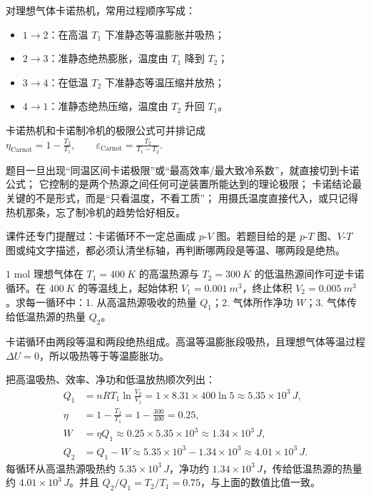 \documentclass[lang=cn,11pt]{elegantbook}
\begin{document}
对理想气体卡诺热机，常用过程顺序写成：
\begin{itemize}
 \item \(1\to2\)：在高温 \(T_1\) 下准静态等温膨胀并吸热；
 \item \(2\to3\)：准静态绝热膨胀，温度由 \(T_1\) 降到 \(T_2\)；
 \item \(3\to4\)：在低温 \(T_2\) 下准静态等温压缩并放热；
 \item \(4\to1\)：准静态绝热压缩，温度由 \(T_2\) 升回 \(T_1\)。
\end{itemize}

卡诺热机和卡诺制冷机的极限公式可并排记成
 \(\eta_{\text{Carnot}}=1-\frac{T_2}{T_1},\qquad \varepsilon_{\text{Carnot}}=\frac{T_2}{T_1-T_2}.\) 

\begin{note}
 题目一旦出现“同温区间卡诺极限”或“最高效率/最大致冷系数”，就直接切到卡诺公式； 它控制的是两个热源之间任何可逆装置所能达到的理论极限； 卡诺结论最关键的不是形式，而是“只看温度，不看工质”； 用摄氏温度直接代入，或只记得热机那条，忘了制冷机的趋势恰好相反。
\end{note}

\begin{remark}
课件还专门提醒过：卡诺循环不一定总画成 \(p\)-\(V\) 图。若题目给的是 \(p\)-\(T\) 图、\(V\)-\(T\) 图或纯文字描述，都必须认清坐标轴，再判断哪两段是等温、哪两段是绝热。
\end{remark}

\begin{exercise}
\(1\) mol 理想气体在 \(T_1=\SI{400}{K}\) 的高温热源与 \(T_2=\SI{300}{K}\) 的低温热源间作可逆卡诺循环。在 \(\SI{400}{K}\) 的等温线上，起始体积 \(V_1=\SI{0.001}{m^3}\)，终止体积 \(V_2=\SI{0.005}{m^3}\)。求每一循环中：1. 从高温热源吸收的热量 \(Q_1\)；2. 气体所作净功 \(W\)；3. 气体传给低温热源的热量 \(Q_2\)。
\end{exercise}

\begin{solution}
卡诺循环由两段等温和两段绝热组成。高温等温膨胀段吸热，且理想气体等温过程 \(\Delta U=0\)，所以吸热等于等温膨胀功。

把高温吸热、效率、净功和低温放热顺次列出：
\[
\begin{aligned}
Q_1&=nRT_1\ln\frac{V_2}{V_1}
=1\times8.31\times400\ln5
\approx 5.35\times10^3\,\si{J},\\
\eta&=1-\frac{T_2}{T_1}
=1-\frac{300}{400}
=0.25,\\
W&=\eta Q_1
\approx0.25\times5.35\times10^3
\approx1.34\times10^3\,\si{J},\\
Q_2&=Q_1-W
\approx 5.35\times10^3-1.34\times10^3
\approx4.01\times10^3\,\si{J}.
\end{aligned}
\]
每循环从高温热源吸热约 \(5.35\times10^3\,\si{J}\)，净功约 \(1.34\times10^3\,\si{J}\)，传给低温热源的热量约 \(4.01\times10^3\,\si{J}\)。并且 \(Q_2/Q_1=T_2/T_1=0.75\)，与上面的数值比值一致。
\end{solution}
\end{document}
